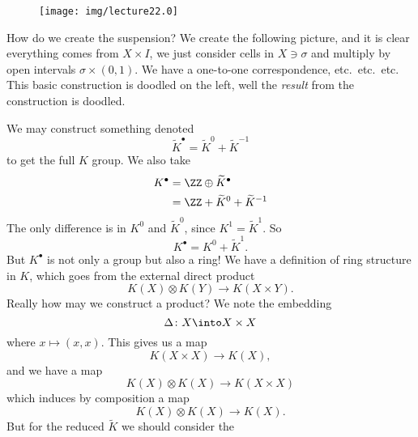 \begin{wrapfigure}{l}{0.69in}
  \vspace{-12pt}
  \texttt{[image: img/lecture22.0]}
\end{wrapfigure}
\noindent{}How do we create the suspension? We create the
following picture, and it is clear everything comes from $X\times
I$, we just consider cells in $X\ni\sigma$ and multiply by open
intervals $\sigma\times(0,1)$. We have a one-to-one
correspondence, etc.\ etc.\ etc.
This basic construction is doodled on the left, well the
\emph{result} from the construction is doodled.

We may construct something denoted
\begin{equation}
\widetilde{K}^{\bullet}=\widetilde{K}^{0}+\widetilde{K}^{-1} 
\end{equation}
to
get the full $K$ group. We also take
\begin{equation}
\begin{split}
K^{\bullet} &= \ZZ\oplus\widetilde{K}^{\bullet} \\
&= \ZZ+\widetilde{K}^{0}+\widetilde{K}^{-1} 
\end{split}
\end{equation}
The only difference is in $K^{0}$ and $\widetilde{K}^{0}$, since
$K^{1}=\widetilde{K}^{1}$. So
\begin{equation}
K^{\bullet}=K^{0}+\widetilde{K}^{1}.
\end{equation}
But $K^{\bullet}$ is not only a group but also a
ring!
We have a definition of ring structure in $K$, which goes from
the external direct product
\begin{equation}
K(X)\otimes K(Y)\to K(X\times Y).
\end{equation}
Really how may we construct a product? We note the embedding
\begin{equation}
\Delta\colon X\into X\times X
\end{equation}
where $x\mapsto(x,x)$. This gives us a map
\begin{equation}
K(X\times X)\to K(X),
\end{equation}
and we have a map
\begin{equation}
K(X)\otimes K(X)\to K(X\times X)
\end{equation}
which induces by composition a map
\begin{equation}
K(X)\otimes K(X)\to K(X).
\end{equation}
But for the reduced $\widetilde{K}$ we should consider the
